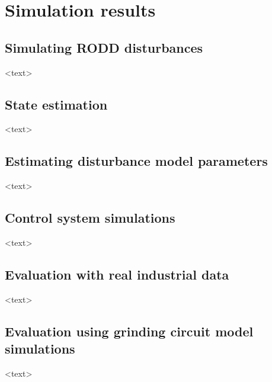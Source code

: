 \chapter{Simulation results}
\label{chap-simulation}

\section{Simulating RODD disturbances}

<text>


\section{State estimation}

<text>


\section{Estimating disturbance model parameters}


<text>


\section{Control system simulations}

<text>


\section{Evaluation with real industrial data}

<text>



\section{Evaluation using grinding circuit model simulations}

<text>


